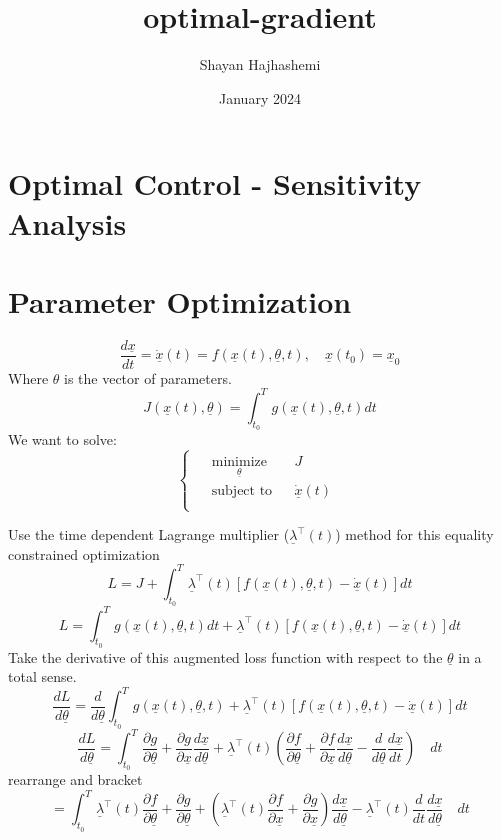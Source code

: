 \documentclass{article}
\title{optimal-gradient}
\author{Shayan Hajhashemi}
\date{January 2024}
\begin{document}
\section{Optimal Control - Sensitivity Analysis}

\section{Parameter Optimization}
\[
\frac{d\underline{x}}{dt}=\dot{\underline{x}}(t) = f\left(\underline{x}(t),\underline{\theta}, t\right), \quad \underline{x}(t_0) = \underline{x}_0
\]
Where $\theta$ is the vector of parameters.
\[
J(\underline{x}(t), \underline{\theta}) = \int^T_{t_0}{g(\underline{x}(t), \underline{\theta}, t) dt}
\]
We want to solve:
\[
\left\{\begin{array}{l}
\begin{aligned}
& \underset{\underline{\theta}}{\text{minimize}} & & J \\
& \text{subject to} & & \dot{\underline{x}}(t) \\
\end{aligned}
\end{array}\right.
\]

Use the time dependent Lagrange multiplier ($\underline{\lambda}^{\top}(t)$) method for this equality constrained optimization
\[
L=J+\int_{t_0}^T \underline{\lambda}^{{\top}}(t)[f(\underline{x}(t), \underline{\theta}, t)-\dot{\underline{x}}(t)] dt
\]
\[
L = \int^T_{t_0}{g(\underline{x}(t), \underline{\theta}, t) dt} + \underline{\lambda}^{{\top}}(t)[f(\underline{x}(t), \underline{\theta}, t)-\dot{\underline{x}}(t)] dt
\]
Take the derivative of this augmented loss function with respect to the $\underline{\theta}$ in a total sense.
\[
\frac{dL}{d\underline{\theta}} = \frac{d}{d\underline{\theta}}\int^T_{t_0}{g(\underline{x}(t), \underline{\theta}, t) + \underline{\lambda}^{{\top}}(t)[f(\underline{x}(t), \underline{\theta}, t)-\dot{\underline{x}}(t)] dt}
\]
\[
\frac{dL}{d\underline{\theta}} = \int^T_{t_0}
\frac{\partial g}{\partial \underline{\theta}} + \frac{\partial g}{\partial \underline{x}}\frac{d\underline{x}}{d\underline{\theta}} + \underline{\lambda}^{{\top}}(t) \left( \frac{\partial f}{\partial \underline{\theta}} + \frac{\partial f}{\partial \underline{x}}\frac{d\underline{x}}{d\underline{\theta}} - \frac{d}{d\underline{\theta}}\frac{d\underline{x}}{dt}\right)\quad dt
\]
rearrange and bracket
\[
= \int^T_{t_0}{\underline{\lambda}^{{\top}}(t) \frac{\partial f}{\partial \underline{\theta}}
+ \frac{\partial g}{\partial \underline{\theta}} +   
\left(\underline{\lambda}^{\top} (t) \frac{\partial f}{\partial \underline{x}}  
+ \frac{\partial g}{\partial \underline{x}}\right)\frac{d\underline{x}}{d\underline{\theta}}
- \underline{\lambda}^{{\top}}(t)\frac{d}{dt}
\frac{d\underline{x}}{d\underline{\theta}}  \quad dt }
\]
\end{document}
